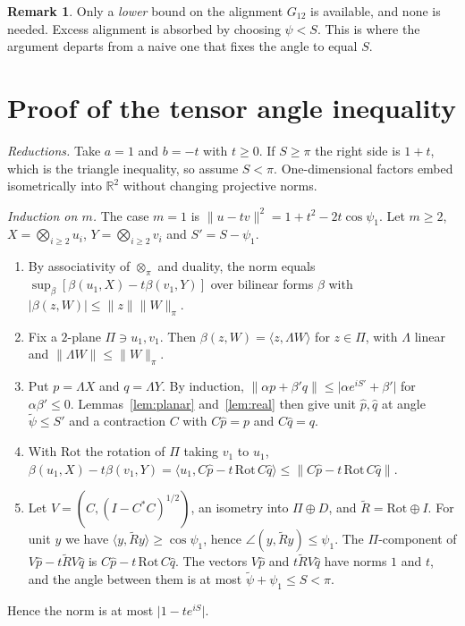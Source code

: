 \documentclass[11pt]{amsart}
\theoremstyle{definition}
\newtheorem*{remark}{Remark}
\newcommand{\R}{\mathbb{R}}
\newcommand{\norm}[1]{\lVert #1\rVert}
\newcommand{\abs}[1]{\lvert #1\rvert}
\newcommand{\ip}[2]{\langle #1,#2\rangle}
\begin{document}
\begin{remark}
Only a \emph{lower} bound on the alignment $G_{12}$ is available, and none is needed.
Excess alignment is absorbed by choosing $\psi<S$. This is where the argument
departs from a naive one that fixes the angle to equal $S$.
\end{remark}

\section{Proof of the tensor angle inequality}

\emph{Reductions.} Take $a=1$ and $b=-t$ with $t\ge0$. If $S\ge\pi$ the right side is
$1+t$, which is the triangle inequality, so assume $S<\pi$. One-dimensional factors
embed isometrically into $\R^2$ without changing projective norms.

\emph{Induction on $m$.} The case $m=1$ is
$\norm{u-tv}^2=1+t^2-2t\cos\psi_1$. Let $m\ge2$, $X=\bigotimes_{i\ge2}u_i$,
$Y=\bigotimes_{i\ge2}v_i$ and $S'=S-\psi_1$.
\begin{enumerate}[label=\textup{(\arabic*)}]
\item By associativity of $\otimes_\pi$ and duality, the norm equals
  $\sup_\beta[\beta(u_1,X)-t\beta(v_1,Y)]$ over bilinear forms $\beta$ with
  $\abs{\beta(z,W)}\le\norm z\norm W_\pi$.
\item Fix a $2$-plane $\Pi\ni u_1,v_1$. Then $\beta(z,W)=\ip z{\Lambda W}$ for $z\in\Pi$,
  with $\Lambda$ linear and $\norm{\Lambda W}\le\norm W_\pi$.
\item Put $p=\Lambda X$ and $q=\Lambda Y$. By induction,
  $\norm{\alpha p+\beta'q}\le\abs{\alpha e^{iS'}+\beta'}$ for $\alpha\beta'\le0$.
  Lemmas~\ref{lem:planar} and~\ref{lem:real} then give unit $\hat p,\hat q$ at angle
  $\tilde\psi\le S'$ and a contraction $C$ with $C\hat p=p$ and $C\hat q=q$.
\item With $\mathrm{Rot}$ the rotation of $\Pi$ taking $v_1$ to $u_1$,
  $\beta(u_1,X)-t\beta(v_1,Y)=\ip{u_1}{C\hat p-t\,\mathrm{Rot}\,C\hat q}\le\norm{C\hat p-t\,\mathrm{Rot}\,C\hat q}$.
\item Let $V=(C,(I-C^*C)^{1/2})$, an isometry into $\Pi\oplus D$, and
  $\tilde R=\mathrm{Rot}\oplus I$. For unit $y$ we have
  $\ip y{\tilde Ry}\ge\cos\psi_1$, hence $\angle(y,\tilde Ry)\le\psi_1$. The
  $\Pi$-component of $V\hat p-t\tilde RV\hat q$ is $C\hat p-t\,\mathrm{Rot}\,C\hat q$.
  The vectors $V\hat p$ and $t\tilde RV\hat q$ have norms $1$ and $t$, and the angle
  between them is at most $\tilde\psi+\psi_1\le S<\pi$.
\end{enumerate}
Hence the norm is at most $\abs{1-te^{iS}}$.
\end{document}
